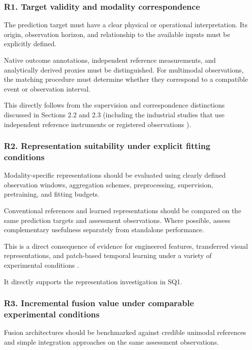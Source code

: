 \subsubsection*{R1. Target validity and modality correspondence}

The prediction target must have a clear physical or operational interpretation. Its origin,
observation horizon, and relationship to the available inputs must be explicitly defined.

Native outcome annotations, independent reference measurements, and analytically derived proxies
must be distinguished. For multimodal observations, the matching procedure must determine whether
they correspond to a compatible event or observation interval.

This directly follows from the supervision and correspondence distinctions discussed in Sections 2.2
and 2.3 (including the industrial studies that use independent reference instruments or registered
observations \citep{Petrich2021Multimodal,Pandiyan2022Deep,Chen2023Multisensor}).

\subsubsection*{R2. Representation suitability under explicit fitting conditions}

Modality-specific representations should be evaluated using clearly defined observation windows,
aggregation schemes, preprocessing, supervision, pretraining, and fitting budgets.

Conventional references and learned representations should be compared on the same prediction
targets and assessment observations. Where possible, assess complementary usefulness separately from
standalone performance.

This is a direct consequence of evidence for engineered features, transferred visual
representations, and patch-based temporal learning under a variety of experimental conditions
\citep{Horwitz2023Back,Roth2022Towards,Nie2023PatchTST}.

It directly supports the representation investigation in SQ1.

\subsubsection*{R3. Incremental fusion value under comparable experimental conditions}

Fusion architectures should be benchmarked against credible unimodal references and simple
integration approaches on the same assessment observations.

